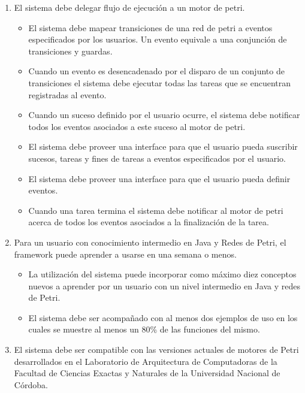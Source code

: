 \begin{enumerate}
	\item El sistema debe delegar flujo de ejecución a un motor de
	petri.
	\begin{itemize}
		\item El sistema debe mapear transiciones de una red de petri a eventos
		especificados por los usuarios. Un evento equivale a una
		conjunción de transiciones y guardas.
		\item Cuando un evento es desencadenado por el disparo de un conjunto de
		transiciones el sistema debe ejecutar todas las tareas que se encuentran registradas al evento.
		\item Cuando un suceso definido por el usuario ocurre, el sistema debe
		notificar todos los eventos asociados a este suceso al motor de petri.
		\item El sistema debe proveer una interface para que el usuario pueda
		suscribir sucesos, tareas y fines de tareas a eventos especificados por el usuario.
		\item El sistema debe proveer una interface para que el usuario pueda definir
		eventos.
		\item Cuando una tarea termina el sistema debe notificar al motor de petri
		acerca de todos los eventos asociados a la finalización de la tarea.
	\end{itemize}
	\item Para un usuario con conocimiento intermedio en Java y Redes de Petri, el
	framework puede aprender a usarse en una semana o menos.
	\begin{itemize}
	    \item La utilización del sistema puede incorporar como máximo diez
	    conceptos nuevos a aprender por un usuario con un nivel intermedio en Java
	    y redes de Petri.
	    \item El sistema debe ser acompañado con al menos dos ejemplos de uso en
	    los cuales se muestre al menos un 80\% de las funciones del mismo.
	\end{itemize}
	\item El sistema debe ser compatible con las versiones actuales de motores de
	Petri desarrollados en el Laboratorio de Arquitectura de Computadoras de la
	Facultad de Ciencias Exactas y Naturales de la Universidad Nacional de Córdoba.

\end{enumerate}
